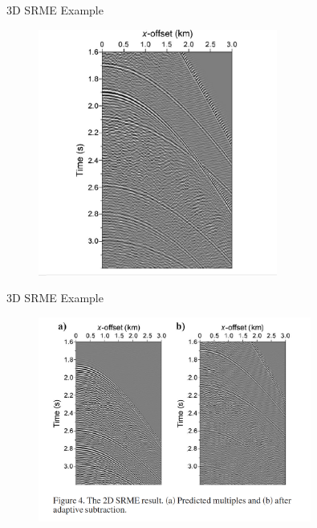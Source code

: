 \documentclass[xcolor=dvipsnames,notes]{beamer}
\begin{document}
\begin{frame}{3D SRME Example}
\begin{figure}
\includegraphics[width=0.7\textwidth]{Fig/fig4.png}
\end{figure}
\end{frame}
\begin{frame}{3D SRME Example}
\begin{figure}
\includegraphics[width=0.8\textwidth]{Fig/fig2.png}
\end{figure}
\end{frame}
\end{document}
